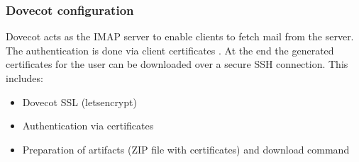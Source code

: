  \subsubsection{Dovecot configuration}
 Dovecot acts as the \gls{IMAP} server to enable clients to fetch mail from the server. 
The authentication is done via client certificates \cite{mail-auth}. 
At the end the generated certificates for the user can be downloaded over a secure SSH connection. This includes:
 \begin{itemize}
     \item{Dovecot \gls{SSL} (letsencrypt)}
     \item{Authentication via certificates}
     \item{Preparation of artifacts (ZIP file with certificates) and download command}
 \end{itemize} 
